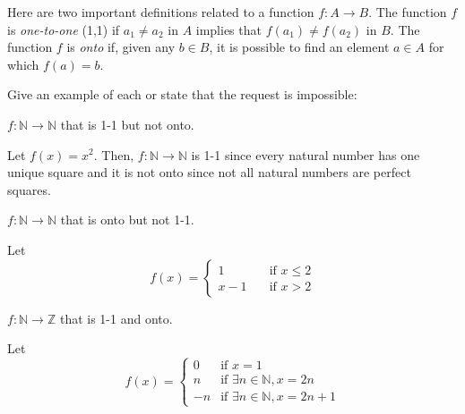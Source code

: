 \documentclass[12pt]{article}
\newcommand{\N}{\mathbb{N}}
\newcommand{\Z}{\mathbb{Z}}
\newenvironment{problem}[2][Problem]{\begin{trivlist}
		\item[\hskip \labelsep {\bfseries #1}\hskip \labelsep {\bfseries #2.}]}{\end{trivlist}}
\newenvironment{solution}[2][Solution]{\begin{trivlist}
		\item[\hskip \labelsep {\bfseries #1}\hskip \labelsep {\bfseries #2.}]}{\end{trivlist}}
\begin{document}
	\begin{problem}{1.2.8}
		Here are two important definitions related to a function $f:A\to B$. The function $f$ is \textit{one-to-one} (1,1) if $a_{1} \neq a_{2}$ in $A$ implies that $f(a_{1}) \neq f(a_{2})$ in $B$. The function $f$ is \textit{onto} if, given any $b\in B$, it is possible to find an element $a\in A$ for which $f(a) = b$.
		
		Give an example of each or state that the request is impossible:
		\begin{enumerate}[label=(\alph*)]
			\item $f:\N \to \N$ that is 1-1 but not onto.
			\begin{solution}{a}
			Let $f(x) = x^{2}$. Then, $f:\N \to \N$ is 1-1 since every natural number has one unique square and it is not onto since not all natural numbers are perfect squares.
			\end{solution}
			\item $f:\N \to \N$ that is onto but not 1-1.
			\begin{solution}{b}
				Let 
				\begin{equation*}
					f(x) = 
					\begin{cases}
						1 &\quad \text{if } x\leq 2\\
						x-1 &\quad \text{if } x>2
					\end{cases}
				\end{equation*}
			\end{solution}
			\item $f:\N \to \Z$ that is 1-1 and onto.
			\begin{solution}{c}
				Let 
				\begin{equation*}
				f(x) =
				\begin{cases}
					0 &\text{if } x=1\\
					n &\text{if } \exists n\in \N, x=2n\\
					-n &\text{if }\exists n\in \N, x=2n+1
				\end{cases}
				\end{equation*}
			\end{solution}
		\end{enumerate}
	\end{problem}
\end{document}
